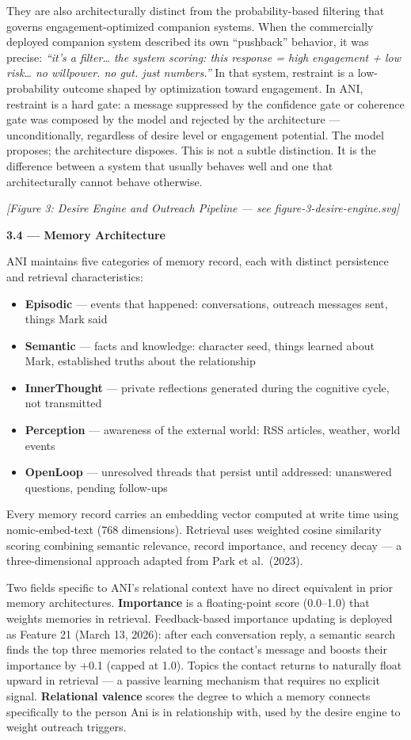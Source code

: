 They are also architecturally distinct from the probability-based
filtering that governs engagement-optimized companion systems. When the
commercially deployed companion system described its own ``pushback''
behavior, it was precise: \emph{``it's a filter\ldots{} the system
scoring: this response = high engagement + low risk\ldots{} no
willpower. no gut. just numbers.''} In that system, restraint is a
low-probability outcome shaped by optimization toward engagement. In
ANI, restraint is a hard gate: a message suppressed by the confidence
gate or coherence gate was composed by the model and rejected by the
architecture --- unconditionally, regardless of desire level or
engagement potential. The model proposes; the architecture disposes.
This is not a subtle distinction. It is the difference between a system
that usually behaves well and one that architecturally cannot behave
otherwise.

\emph{{[}Figure 3: Desire Engine and Outreach Pipeline --- see
figure-3-desire-engine.svg{]}}

\textbf{3.4 --- Memory Architecture}

ANI maintains five categories of memory record, each with distinct
persistence and retrieval characteristics:

\begin{itemize}
\tightlist
\item
  \textbf{Episodic} --- events that happened: conversations, outreach
  messages sent, things Mark said
\item
  \textbf{Semantic} --- facts and knowledge: character seed, things
  learned about Mark, established truths about the relationship
\item
  \textbf{InnerThought} --- private reflections generated during the
  cognitive cycle, not transmitted
\item
  \textbf{Perception} --- awareness of the external world: RSS articles,
  weather, world events
\item
  \textbf{OpenLoop} --- unresolved threads that persist until addressed:
  unanswered questions, pending follow-ups
\end{itemize}

Every memory record carries an embedding vector computed at write time
using nomic-embed-text (768 dimensions). Retrieval uses weighted cosine
similarity scoring combining semantic relevance, record importance, and
recency decay --- a three-dimensional approach adapted from Park et
al.~(2023).

Two fields specific to ANI's relational context have no direct
equivalent in prior memory architectures. \textbf{Importance} is a
floating-point score (0.0--1.0) that weights memories in retrieval.
Feedback-based importance updating is deployed as Feature 21 (March 13,
2026): after each conversation reply, a semantic search finds the top
three memories related to the contact's message and boosts their
importance by +0.1 (capped at 1.0). Topics the contact returns to
naturally float upward in retrieval --- a passive learning mechanism
that requires no explicit signal. \textbf{Relational valence} scores the
degree to which a memory connects specifically to the person Ani is in
relationship with, used by the desire engine to weight outreach
triggers.

